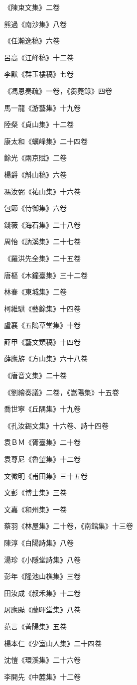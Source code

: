 《陳束文集》二卷

熊過《南沙集》八卷

《任瀚逸稿》六卷

呂高《江峰稿》十二卷

李默《群玉樓稿》七卷

《馮恩奏疏》一卷，《芻蕘錄》四卷

馬一龍《游藝集》十九卷

陸粲《貞山集》十二卷

康太和《蠣峰集》二十四卷

餘光《兩京賦》二卷

楊爵《斛山稿》六卷

馮汝弼《祐山集》十六卷

包節《侍御集》六卷

錢薇《海石集》二十八卷

周怡《訥溪集》二十七卷

《羅洪先全集》二十五卷

唐樞《木鐘臺集》三十二卷

林春《東城集》二卷

柯維騏《藝餘集》十四卷

盧襄《五隖草堂集》十卷

薛甲《藝文類稿》十四卷

薛應旂《方山集》六十八卷

《唐音文集》二十卷

《劉繪奏議》二卷，《嵩陽集》十五卷

喬世寧《丘隅集》十九卷

《孔汝錫文集》十六卷、詩十四卷

袁ＢＭ《胥臺集》二十卷

袁尊尼《魯望集》十二卷

文徵明《甫田集》三十五卷

文彭《博士集》三卷

文嘉《和州集》一卷

蔡羽《林屋集》二十卷，《南館集》十三卷

陳淳《白陽詩集》八卷

湯珍《小隱堂詩集》八卷

彭年《隆池山樵集》三卷

田汝成《叔禾集》十二卷

屠應颭《蘭暉堂集》八卷

范言《菁陽集》五卷

楊本仁《少室山人集》二十四卷

沈愷《環溪集》二十六卷

李開先《中麓集》十二卷

